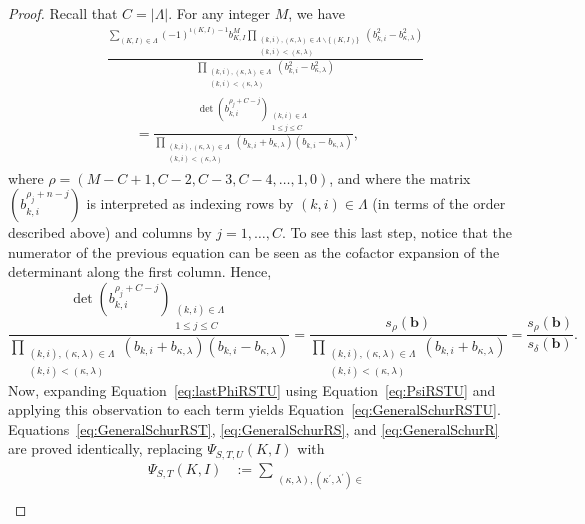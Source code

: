 \documentclass{amsart}
\theoremstyle{definition}
\theoremstyle{remark}
\newcommand{\bs}{\boldsymbol}
\begin{document}
\begin{proof}
Recall that $C = |\Lambda|$. For any
integer $M$, we have
\begin{align*}
    &\frac{ \sum\limits_{(K,I) \in \Lambda} (-1)^{\iota(K,I)-1}
        b_{K,I}^M
        \prod\limits_{\substack{(k,i),(\kappa,\lambda)\in\Lambda\smallsetminus \{(K,I)\} \\ (k,i) < (\kappa,\lambda) }}
            (b_{k,i}^2 - b_{\kappa,\lambda}^2) }
            {\prod\limits_{\substack{(k,i),(\kappa,\lambda)\in\Lambda \\ (k,i) < (\kappa,\lambda) }}
                (b_{k,i}^2 - b_{\kappa,\lambda}^2) }
    \\&\quad\quad=
    \frac{ \det\left( b_{k,i}^{\rho_j + C - j} \right)_{\substack{(k,i)\in\Lambda \\ 1\leq j \leq C}} }
        {\prod\limits_{\substack{(k,i),(\kappa,\lambda)\in\Lambda \\ (k,i) < (\kappa,\lambda) }}
            (b_{k,i} + b_{\kappa,\lambda})(b_{k,i} - b_{\kappa,\lambda}) },
\end{align*}
where $\rho = (M-C+1, C-2, C-3, C-4, \ldots, 1, 0)$, and where the matrix
$\left(b_{k,i}^{\rho_j + n - j}\right)$ is interpreted as indexing rows by $(k,i)\in\Lambda$ (in terms
of the order described above) and columns by $j = 1,\ldots,C$. To see this last step, notice that the numerator
of the previous equation can be seen as the cofactor expansion of the determinant along the first column.
Hence,
\[
    \frac{ \det\left( b_{k,i}^{\rho_j + C - j} \right)_{\substack{(k,i)\in\Lambda \\ 1\leq j \leq C}} }
        {\prod\limits_{\substack{(k,i),(\kappa,\lambda)\in\Lambda \\ (k,i) < (\kappa,\lambda) }}
            (b_{k,i} + b_{\kappa,\lambda})(b_{k,i} - b_{\kappa,\lambda}) }
    =
    \frac{ s_{\rho}(\bs{b}) }
        {\prod\limits_{\substack{(k,i),(\kappa,\lambda)\in\Lambda \\ (k,i) < (\kappa,\lambda) }}
            (b_{k,i} + b_{\kappa,\lambda}) }
    =
    \frac{ s_{\rho}(\bs{b}) }
        { s_{\delta}(\bs{b}) }.
\]
Now, expanding Equation~\eqref{eq:lastPhiRSTU} using Equation~\eqref{eq:PsiRSTU} and applying this
observation to each term yields Equation~\eqref{eq:GeneralSchurRSTU}.
Equations~\eqref{eq:GeneralSchurRST}, \eqref{eq:GeneralSchurRS}, and \eqref{eq:GeneralSchurR}
are proved identically, replacing $\Psi_{S,T,U}(K,I)$ with
\begin{align*}
    \Psi_{S,T}(K,I)
    &:=     \sum\limits_{\substack{(\kappa,\lambda),(\kappa^\prime,\lambda^\prime)\in  \\
}}
\end{align*}
\end{proof}
\end{document}
